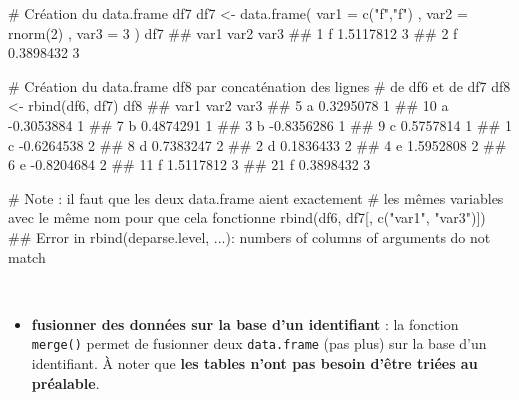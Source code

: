 \documentclass[12pt,twosided, notitlepage]{book}
\newenvironment{Shaded}{}{}
\newcommand{\CommentTok}[1]{\textcolor[rgb]{0.00,0.50,0.00}{#1}}
\newcommand{\DataTypeTok}[1]{#1}
\newcommand{\DecValTok}[1]{#1}
\newcommand{\KeywordTok}[1]{\textcolor[rgb]{0.00,0.00,1.00}{#1}}
\newcommand{\NormalTok}[1]{#1}
\newcommand{\StringTok}[1]{\textcolor[rgb]{0.00,0.50,0.50}{#1}}
\providecommand{\tightlist}{%
  \setlength{\itemsep}{0pt}\setlength{\parskip}{0pt}}
\renewenvironment{Shaded}{\begin{snugshade}}{\end{snugshade}}
\begin{document}
\begin{Shaded}
\begin{Highlighting}[]
\CommentTok{# Création du data.frame df7}
\NormalTok{df7 <-}\StringTok{ }\KeywordTok{data.frame}\NormalTok{(}
  \DataTypeTok{var1 =} \KeywordTok{c}\NormalTok{(}\StringTok{"f"}\NormalTok{,}\StringTok{"f"}\NormalTok{)}
\NormalTok{  , }\DataTypeTok{var2 =} \KeywordTok{rnorm}\NormalTok{(}\DecValTok{2}\NormalTok{)}
\NormalTok{  , }\DataTypeTok{var3 =} \DecValTok{3}
\NormalTok{)}
\NormalTok{df7}
\NormalTok{  ##   var1      var2 var3}
\NormalTok{  ## 1    f 1.5117812    3}
\NormalTok{  ## 2    f 0.3898432    3}

\CommentTok{# Création du data.frame df8 par concaténation des lignes }
\CommentTok{# de df6 et de df7}
\NormalTok{df8 <-}\StringTok{ }\KeywordTok{rbind}\NormalTok{(df6, df7)}
\NormalTok{df8}
\NormalTok{  ##    var1       var2 var3}
\NormalTok{  ## 5     a  0.3295078    1}
\NormalTok{  ## 10    a -0.3053884    1}
\NormalTok{  ## 7     b  0.4874291    1}
\NormalTok{  ## 3     b -0.8356286    1}
\NormalTok{  ## 9     c  0.5757814    1}
\NormalTok{  ## 1     c -0.6264538    2}
\NormalTok{  ## 8     d  0.7383247    2}
\NormalTok{  ## 2     d  0.1836433    2}
\NormalTok{  ## 4     e  1.5952808    2}
\NormalTok{  ## 6     e -0.8204684    2}
\NormalTok{  ## 11    f  1.5117812    3}
\NormalTok{  ## 21    f  0.3898432    3}

\CommentTok{# Note : il faut que les deux data.frame aient exactement}
\CommentTok{# les mêmes variables avec le même nom pour que cela fonctionne}
\KeywordTok{rbind}\NormalTok{(df6, df7[, }\KeywordTok{c}\NormalTok{(}\StringTok{"var1"}\NormalTok{, }\StringTok{"var3"}\NormalTok{)])}
\NormalTok{  ## Error in rbind(deparse.level, ...): numbers of columns of arguments do not match}
\end{Highlighting}
\end{Shaded}

~

\begin{itemize}
\tightlist
\item
  \textbf{fusionner des données sur la base d'un identifiant} : la
  fonction \texttt{merge()} permet de
  fusionner deux \texttt{data.frame} (pas plus) sur la base d'un
  identifiant. À noter que \textbf{les tables n'ont pas besoin d'être
  triées au préalable}.
\end{itemize}
\end{document}
